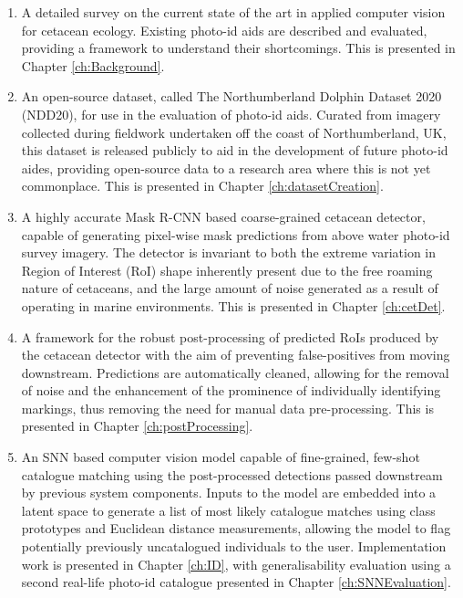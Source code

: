\begin{enumerate}
	\item A detailed survey on the current state of the art in applied computer vision for cetacean ecology. Existing photo-id aids are described and evaluated, providing a framework to understand their shortcomings. This is presented in Chapter \ref{ch:Background}. 
	\item An open-source dataset, called The Northumberland Dolphin Dataset 2020 (NDD20), for use in the evaluation of photo-id aids. Curated from imagery collected during fieldwork undertaken off the coast of Northumberland, UK, this dataset is released publicly to aid in the development of future photo-id aides, providing open-source data to a research area where this is not yet commonplace. This is presented in Chapter \ref{ch:datasetCreation}.
	\item A highly accurate Mask R-CNN \cite{he_mask_2017} based coarse-grained cetacean detector, capable of generating pixel-wise mask predictions from above water photo-id survey imagery. The detector is invariant to both the extreme variation in Region of Interest (RoI) shape inherently present due to the free roaming nature of cetaceans, and the large amount of noise generated as a result of operating in marine environments.  This is presented in Chapter \ref{ch:cetDet}.
	\item A framework for the robust post-processing of predicted RoIs produced by the cetacean detector with the aim of preventing false-positives from moving downstream. Predictions are automatically cleaned, allowing for the removal of noise and the enhancement of the prominence of individually identifying markings, thus removing the need for manual data pre-processing. This is presented in Chapter \ref{ch:postProcessing}.
	\item An SNN based computer vision model capable of fine-grained, few-shot catalogue matching using the post-processed detections passed downstream by previous system components. Inputs to the model are embedded into a latent space to generate a list of most likely catalogue matches using class prototypes and Euclidean distance measurements, allowing the model to flag potentially previously uncatalogued individuals to the user. Implementation work is presented in Chapter \ref{ch:ID}, with generalisability evaluation using a second real-life photo-id catalogue presented in Chapter \ref{ch:SNNEvaluation}.
\end{enumerate}

